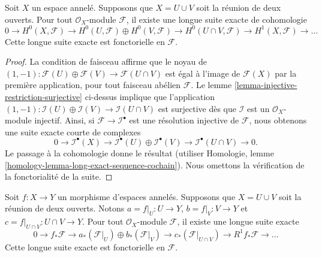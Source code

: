 \begin{lemma}
\label{lemma-mayer-vietoris}
Soit $X$ un espace annelé. Supposons que $X = U \cup V$ soit la réunion de deux ouverts. Pour tout $\mathcal{O}_X$-module $\mathcal{F}$, il existe une longue suite exacte de cohomologie $$
0 \to
H^0(X, \mathcal{F}) \to
H^0(U, \mathcal{F}) \oplus H^0(V, \mathcal{F}) \to
H^0(U \cap V, \mathcal{F}) \to
H^1(X, \mathcal{F}) \to \ldots
$$ Cette longue suite exacte est fonctorielle en $\mathcal{F}$.
\end{lemma}

\begin{proof}

La condition de faisceau affirme que le noyau de
$(1, -1) : \mathcal{F}(U) \oplus \mathcal{F}(V) \to \mathcal{F}(U \cap V)$
est égal à l'image de $\mathcal{F}(X)$ par la première application, pour tout faisceau abélien $\mathcal{F}$. Le lemme \ref{lemma-injective-restriction-surjective} ci-dessus implique que l'application
$(1, -1) : \mathcal{I}(U) \oplus \mathcal{I}(V) \to \mathcal{I}(U \cap V)$
est surjective dès que $\mathcal{I}$ est un $\mathcal{O}_X$-module injectif. Ainsi, si $\mathcal{F} \to \mathcal{I}^\bullet$ est une résolution injective de $\mathcal{F}$, nous obtenons une suite exacte courte de complexes
$$
0 \to
\mathcal{I}^\bullet(X) \to
\mathcal{I}^\bullet(U) \oplus \mathcal{I}^\bullet(V) \to
\mathcal{I}^\bullet(U \cap V) \to
0.
$$
Le passage à la cohomologie donne le résultat (utiliser Homologie, lemme \ref{homology-lemma-long-exact-sequence-cochain}). Nous omettons la vérification de la fonctorialité de la suite.

\end{proof}

\begin{lemma}
\label{lemma-relative-mayer-vietoris}
Soit $f : X \to Y$ un morphisme d'espaces annelés. Supposons que $X = U \cup V$ soit la réunion de deux ouverts. Notons $a = f|_U : U \to Y$, $b = f|_V : V \to Y$ et $c = f|_{U \cap V} : U \cap V \to Y$. Pour tout $\mathcal{O}_X$-module $\mathcal{F}$, il existe une longue suite exacte $$
0 \to
f_*\mathcal{F} \to
a_*(\mathcal{F}|_U) \oplus b_*(\mathcal{F}|_V) \to
c_*(\mathcal{F}|_{U \cap V}) \to
R^1f_*\mathcal{F} \to \ldots
$$ Cette longue suite exacte est fonctorielle en $\mathcal{F}$.
\end{lemma}

